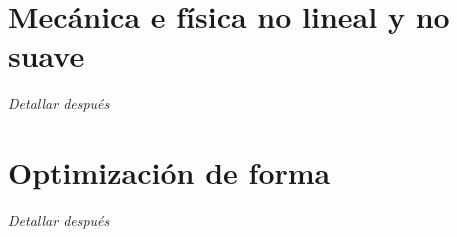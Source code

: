\documentclass[12pt]{book}
\theoremstyle{definition}
\theoremstyle{plain}
\theoremstyle{remark}
\begin{document}
\section{Mecánica e física no lineal y no suave}

\emph{Detallar después}

\section{Optimización de forma}

\emph{Detallar después}

%
%








\end{document}
